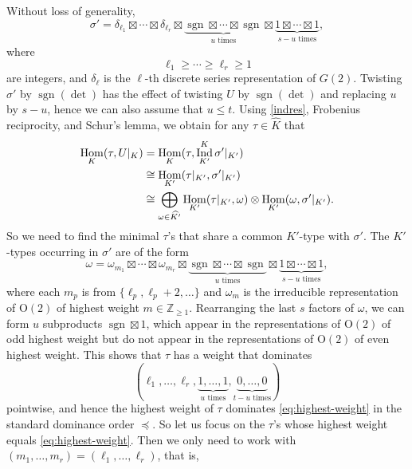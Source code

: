 \documentclass[11pt,oneside]{amsart}
\numberwithin{equation}{section}
\theoremstyle{remark}
\theoremstyle{plain}
\DeclareMathOperator{\sgn}{sgn}
\DeclareMathOperator{\Hom}{Hom}
\DeclareMathOperator{\Ind}{Ind}
\newcommand\OO{\mathrm{O}}
\newcommand\ZZ{\mathbb{Z}}
\renewcommand\leq{\leqslant}
\renewcommand\geq{\geqslant}
\begin{document}
Without loss of generality,
\begin{equation}\label{sigma'}
\sigma'=\delta_{\ell_1}\boxtimes\dotsb\boxtimes\delta_{\ell_r}
\boxtimes\underbrace{\sgn\boxtimes\dotsb\boxtimes\sgn}_{\text{$u$ times}}
\boxtimes\underbrace{1\boxtimes\dotsb\boxtimes1}_{\text{$s-u$ times}},
\end{equation}
where
\begin{equation}\label{eq:ordering-ell-s}
\ell_1\geq\dotsb\geq\ell_r\geq 1
\end{equation}
are integers, and $\delta_\ell$ is the $\ell$-th discrete series representation of $G(2)$. Twisting $\sigma'$ by $\sgn(\det)$ has the effect of twisting $U$ by $\sgn(\det)$ and replacing $u$ by $s-u$, hence we can also assume that $u\leq t$. Using \eqref{indres}, Frobenius reciprocity, and Schur's lemma, we obtain for any $\tau\in\widehat{K}$ that
\begin{align}
\Hom_K(\tau,U|_K)
\notag&=\Hom_K(\tau,\Ind_{K'}^K\sigma'|_{K'})\\
\notag&\cong\Hom_{K'}(\tau|_{K'},\sigma'|_{K'})\\
\label{schur-Hom}&\cong\bigoplus_{\omega\in\widehat{K'}}\Hom_{K'}(\tau|_{K'},\omega)\otimes\Hom_{K'}(\omega,\sigma'|_{K'}).
\end{align}
So we need to find the minimal $\tau$'s that share a common $K'$-type with $\sigma'$. The $K'$-types occurring in $\sigma'$ are of the form
\begin{equation}\label{eq:omega-tensor}
\omega=\omega_{m_1}\boxtimes\dotsb\boxtimes\omega_{m_r}
\boxtimes\underbrace{\sgn\boxtimes\dotsb\boxtimes\sgn}_{\text{$u$ times}}
\boxtimes\underbrace{1\boxtimes\dotsb\boxtimes1}_{\text{$s-u$ times}},
\end{equation}
where each $m_p$ is from $\{\ell_p,\ell_p+2,\dotsc\}$ and $\omega_m$ is the irreducible representation of $\OO(2)$ of highest weight $m\in\ZZ_{\geq 1}$. Rearranging the last $s$ factors of $\omega$, we can form $u$ subproducts $\sgn\boxtimes 1$, which 
appear in the representations of $\OO(2)$ of odd highest weight but do not appear in the representations of $\OO(2)$ of even highest weight. This shows that $\tau$ has a weight that dominates
\begin{equation}\label{eq:highest-weight}
(\ell_1,\dotsc,\ell_r,\underbrace{1,\dotsc,1}_{\text{$u$ times}},\underbrace{0,\dotsc,0}_{\text{$t-u$ times}})
\end{equation}
pointwise, and hence the highest weight of $\tau$ dominates \eqref{eq:highest-weight} in the standard dominance order $\preceq$. So let us focus on the $\tau$'s whose highest weight equals \eqref{eq:highest-weight}. Then we only need to work with $(m_1,\dotsc,m_r)=(\ell_1,\dotsc,\ell_r)$, that is,
\end{document}
